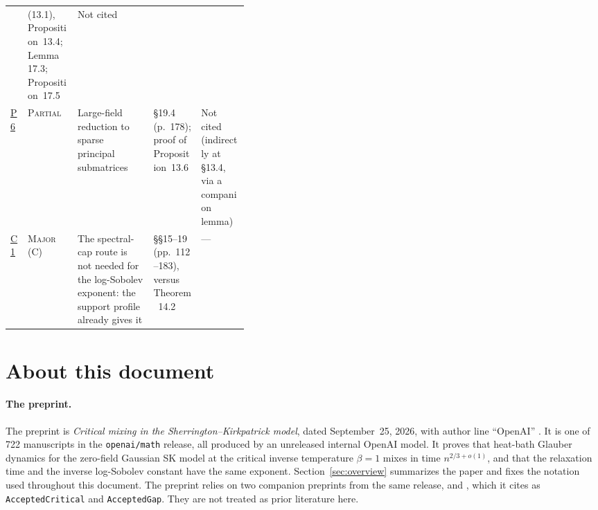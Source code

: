 \documentclass[11pt]{article}
\newcommand{\grade}[1]{\textsc{#1}}
\begin{document}
\begin{center}
\begin{xltabular}{\linewidth}{@{}l l >{\raggedright\arraybackslash}X >{\raggedright\arraybackslash}p{0.2\linewidth} >{\raggedright\arraybackslash}p{0.2\linewidth}@{}}
\cite{Celentano2022-SudakovFerniquePostAMPTAPConvexity} &
(13.1), Proposition~13.4; Lemma~17.3; Proposition~17.5 &
Not cited\\
\addlinespace
\hyperref[f:P6]{P6} & \grade{Partial} &
Large-field reduction to sparse principal submatrices
\cite{BandeiraElAlaouiRodder2026-GlauberHighOverlapGibbs} &
\S19.4 (p.~178); proof of Proposition~13.6 &
Not cited (indirectly at \S13.4, via a companion lemma)\\
\midrule
\hyperref[f:C1]{C1} & \grade{Major} (C) &
The spectral-cap route is not needed for the log-Sobolev exponent: the support
profile already gives it
\cite{HermonPeres2016-L2MixingHypercontractivityHitting,DiaconisSaloffCoste1996-LogSobolevFiniteMarkovChains} &
\S\S15--19 (pp.~112--183), versus Theorem~14.2 &
---\\
\bottomrule
\end{xltabular}
\end{center}

\clearpage

\tableofcontents

\section{About this document}\label{sec:about}

\paragraph{The preprint.}
The preprint is \emph{Critical mixing in the Sherrington--Kirkpatrick model},
dated September~25, 2026, with author line ``OpenAI''
\cite{OAI-CriticalMixing}. It is one of 722 manuscripts in the
\texttt{openai/math} release, all produced by an unreleased internal OpenAI
model. It proves that heat-bath Glauber dynamics for the zero-field Gaussian
SK model at the critical inverse temperature $\beta=1$ mixes in time
$n^{2/3+o(1)}$, and that the relaxation time and the inverse log-Sobolev
constant have the same exponent. Section~\ref{sec:overview} summarizes the
paper and fixes the notation used throughout this document. The preprint
relies on two companion preprints from the same release,
\cite{OAI-AcceptedCritical} and \cite{OAI-AcceptedGap}, which it cites as
\texttt{AcceptedCritical} and \texttt{AcceptedGap}. They are not treated as
prior literature here.
\end{document}
